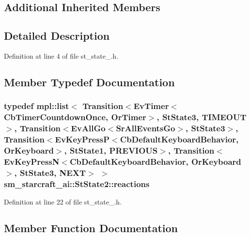 \subsection*{Additional Inherited Members}


\subsection{Detailed Description}


Definition at line 4 of file st\+\_\+state\+\_.\+h.



\subsection{Member Typedef Documentation}
\subsubsection[{\texorpdfstring{reactions}{reactions}}]{\setlength{\rightskip}{0pt plus 5cm}typedef mpl\+::list$<$ Transition$<$Ev\+Timer$<$Cb\+Timer\+Countdown\+Once, {\bf Or\+Timer}$>$, {\bf St\+State3}, {\bf T\+I\+M\+E\+O\+UT}$>$, Transition$<$Ev\+All\+Go$<$Sr\+All\+Events\+Go$>$, {\bf St\+State3}$>$, Transition$<$Ev\+Key\+PressP$<$Cb\+Default\+Keyboard\+Behavior, {\bf Or\+Keyboard}$>$, {\bf St\+State1}, {\bf P\+R\+E\+V\+I\+O\+US}$>$, Transition$<$Ev\+Key\+PressN$<$Cb\+Default\+Keyboard\+Behavior, {\bf Or\+Keyboard}$>$, {\bf St\+State3}, {\bf N\+E\+XT}$>$ $>$ {\bf sm\+\_\+starcraft\+\_\+ai\+::\+St\+State2\+::reactions}}\hypertarget{structsm__starcraft__ai_1_1StState2_a90bc8036f232c8223d573adfdce964a8}{}\label{structsm__starcraft__ai_1_1StState2_a90bc8036f232c8223d573adfdce964a8}


Definition at line 22 of file st\+\_\+state\+\_.\+h.



\subsection{Member Function Documentation}
